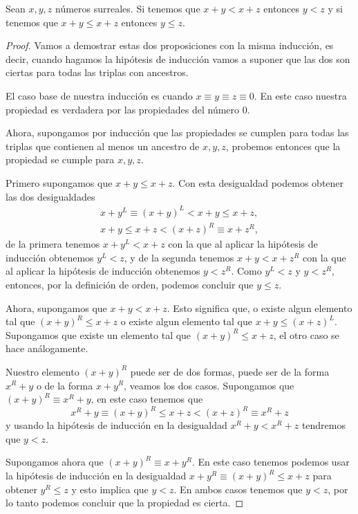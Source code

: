     \begin{theorem}[Cancelaci\'on]
        Sean $x,y, z$ n\'umeros surreales. Si tenemos que $x+y < x+z$ entonces $y < z$ y si tenemos que $x+y\le x+z$ entonces $y\le z$.
    \end{theorem}

    \begin{proof}
        Vamos a demostrar estas dos proposiciones con la misma inducci\'on, es decir, cuando hagamos la hip\'otesis de inducci\'on vamos a suponer que las dos son ciertas para todas las triplas con ancestros.

        El caso base de nuestra inducci\'on es cuando $x\equiv y \equiv z \equiv 0$. En este caso nuestra propiedad es verdadera por las propiedades del n\'umero $0$.

        Ahora, supongamos por inducci\'on que las propiedades se cumplen para todas las triplas que contienen al menos un ancestro de $x,y,z$, probemos entonces que la propiedad se cumple para $x,y,z$.

        Primero supongamos que $x+y\le x+z$. Con esta desigualdad podemos obtener las dos desigualdades
        \begin{align*}
            x+y^L \equiv (x+y)^L < x+y \le x + z,\\
            x+y \le x+z < (x+z)^R \equiv x+z^R,
        \end{align*}
        de la primera tenemos $x + y^L < x + z$ con la que al aplicar la hip\'otesis de inducci\'on obtenemos $y^L < z$, y de la segunda tenemos $x+y < x+z^R$ con la que al aplicar la hip\'otesis de inducci\'on obtenemos $y < z^R$. Como $y^L < z$ y $y < z^R$, entonces, por la definici\'on de orden, podemos concluir que $y \le z$.

        Ahora, supongamos que $x+y < x+z$. Esto significa que, o existe algun elemento tal que $(x+y)^R \le x+z$ o existe algun elemento tal que $x+y \le (x+z)^L$. Supongamos que existe un elemento tal que $(x+y)^R \le x+z$, el otro caso se hace an\'alogamente.

        Nuestro elemento $(x+y)^R$ puede ser de dos formas, puede ser de la forma $x^R+y$ o de la forma $x+y^R$, veamos los dos casos. Supongamos que $(x+y)^R\equiv x^R+y$, en este caso tenemos que
        \[
            x^R+y \equiv (x+y)^R \le x+z < (x+z)^R\equiv x^R + z
        \]
        y usando la hip\'otesis de inducci\'on en la desigualdad $x^R+y < x^R + z$ tendremos que $y < z$.

        Supongamos ahora que $(x+y)^R\equiv x+y^R$. En este caso tenemos podemos usar la hip\'otesis de inducci\'on en la desigualdad $x+y^R \equiv (x+y)^R \le x+z$ para obtener $y^R \le z$ y esto implica que $y < z$. En ambos casos tenemos que $y < z$, por lo tanto podemos concluir que la propiedad es cierta.
    \end{proof}

